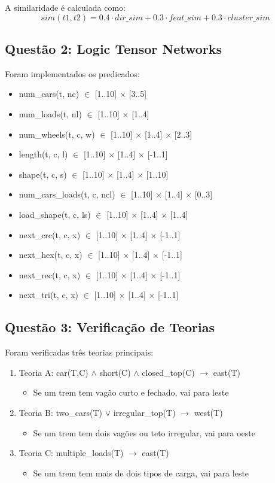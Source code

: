 \documentclass[a4paper,twoside]{article}
\begin{document}
A similaridade \'e calculada como:
\[ sim(t1, t2) = 0.4 \cdot dir\_sim + 0.3 \cdot feat\_sim + 0.3 \cdot cluster\_sim \]

\subsection{Quest\~ao 2: Logic Tensor Networks}
Foram implementados os predicados:

\begin{itemize}
    \item num\_cars(t, nc) $\in$ [1..10] $\times$ [3..5]
    \item num\_loads(t, nl) $\in$ [1..10] $\times$ [1..4]
    \item num\_wheels(t, c, w) $\in$ [1..10] $\times$ [1..4] $\times$ [2..3]
    \item length(t, c, l) $\in$ [1..10] $\times$ [1..4] $\times$ [-1..1]
    \item shape(t, c, s) $\in$ [1..10] $\times$ [1..4] $\times$ [1..10]
    \item num\_cars\_loads(t, c, ncl) $\in$ [1..10] $\times$ [1..4] $\times$ [0..3]
    \item load\_shape(t, c, ls) $\in$ [1..10] $\times$ [1..4] $\times$ [1..4]
    \item next\_crc(t, c, x) $\in$ [1..10] $\times$ [1..4] $\times$ [-1..1]
    \item next\_hex(t, c, x) $\in$ [1..10] $\times$ [1..4] $\times$ [-1..1]
    \item next\_rec(t, c, x) $\in$ [1..10] $\times$ [1..4] $\times$ [-1..1]
    \item next\_tri(t, c, x) $\in$ [1..10] $\times$ [1..4] $\times$ [-1..1]
\end{itemize}
\subsection{Quest\~ao 3: Verifica\c{c}\~ao de Teorias}
Foram verificadas tr\^es teorias principais:

\begin{enumerate}
    \item Teoria A: car(T,C) $\land$ short(C) $\land$ closed\_top(C) $\rightarrow$ east(T)
    \begin{itemize}
        \item Se um trem tem vag\~ao curto e fechado, vai para leste
    \end{itemize}
    
    \item Teoria B: two\_cars(T) $\lor$ irregular\_top(T) $\rightarrow$ west(T)
    \begin{itemize}
        \item Se um trem tem dois vag\~oes ou teto irregular, vai para oeste
    \end{itemize}
    
    \item Teoria C: multiple\_loads(T) $\rightarrow$ east(T)
    \begin{itemize}
        \item Se um trem tem mais de dois tipos de carga, vai para leste
    \end{itemize}
\end{enumerate}
\end{document}
